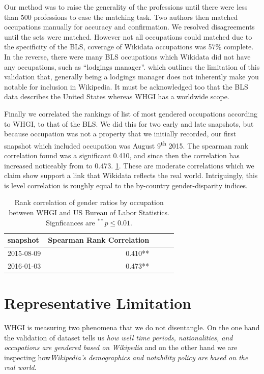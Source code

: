 \documentclass[letterpaper]{article}
\begin{document}
Our method was to raise the generality of the professions until there were less than 500 professions to ease the matching task. Two authors then matched occupations manually for accuracy and confirmation. We resolved disagreements until the sets were matched. However not all occupations could matched due to the specificity of the BLS, coverage of Wikidata occupations was 57\% complete. In the reverse, there were many BLS occupations which Wikidata did not have any occupations, such as ``lodgings manager''. which outlines the limitation of this validation that, generally being a lodgings manager does not inherently make you notable for inclusion in Wikipedia. It must be acknowledged too that the BLS data describes the United States whereas WHGI has a worldwide scope.

Finally we correlated the rankings of list of most gendered occupations according to WHGI, to that of the BLS. We did this for two early and late snapshots, but because occupation was not a property that we initially recorded, our first snapshot which included occupation was August 9\textsuperscript{th} 2015. The spearman rank correlation found was a significant 0.410,  and since then the correlation has increased noticeably from to 0.473. \ref{table:bls}. These are moderate correlations which we claim show support a link that Wikidata reflects the real world. Intriguingly, this is level correlation is roughly equal to the by-country gender-disparity indices.

\begin{table}
\caption{Rank correlation of gender ratios by occupation between WHGI and US
Bureau of Labor Statistics. Signficances are $ ^{**}p\leq 0.01$.}
\label{table:bls}
\begin{tabular}{lrrrr}
\toprule
snapshot &  Spearman Rank Correlation \\
\midrule
2015-08-09 & 0.410**  \\
2016-01-03 & 0.473**  \\
\bottomrule
\end{tabular}
\end{table}

\section{Representative Limitation}
 WHGI is measuring two phenomena that we do not disentangle. On the one hand the validation of dataset tells us \textit{how well time periods, nationalities, and occupations are gendered based on Wikipedia} and on the other hand we are inspecting how\textit{Wikipedia's demographics and notability policy are based on the real world}.
\end{document}
